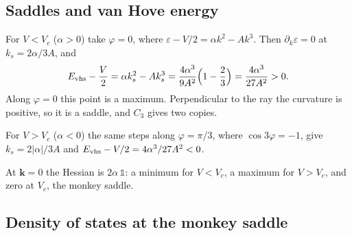 \documentclass[12pt,a4paper]{article}
\newcommand{\bk}{\mathbf{k}}
\newcommand{\Evhs}{E_{\rm vhs}}
\begin{document}
\subsection{Saddles and van Hove energy}

For $V<V_c$ ($\alpha>0$) take $\varphi=0$, where $\varepsilon-V/2=\alpha k^2-Ak^3$. Then $\partial_k\varepsilon=0$ at $k_s=2\alpha/3A$, and
\begin{equation}
\Evhs-\frac V2=\alpha k_s^2-Ak_s^3=\frac{4\alpha^3}{9A^2}\Big(1-\frac23\Big)=\frac{4\alpha^3}{27A^2}>0 .
\end{equation}
Along $\varphi=0$ this point is a maximum. Perpendicular to the ray the curvature is positive, so it is a saddle, and $C_3$ gives two copies.

For $V>V_c$ ($\alpha<0$) the same steps along $\varphi=\pi/3$, where $\cos3\varphi=-1$, give $k_s=2|\alpha|/3A$ and $\Evhs-V/2=4\alpha^3/27A^2<0$.

At $\bk=0$ the Hessian is $2\alpha\,\mathbb 1$: a minimum for $V<V_c$, a maximum for $V>V_c$, and zero at $V_c$, the monkey saddle.

\subsection{Density of states at the monkey saddle}
\end{document}
